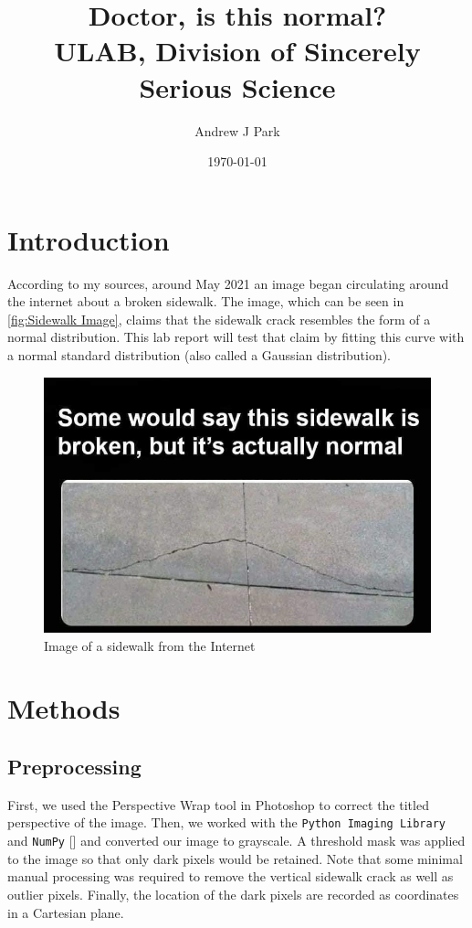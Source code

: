\documentclass{article}
\title{Doctor, is this normal? \\ \large ULAB, Division of Sincerely Serious Science}
\author{Andrew J Park}
\date{\today}
\begin{document}
\maketitle

\section{Introduction}

According to my sources, around May 2021 an image began circulating around the internet about a broken
sidewalk. The image, which can be seen in \autoref{fig:Sidewalk Image}, claims that the sidewalk crack resembles the form
of a normal distribution. This lab report will test that claim by fitting this curve with a normal standard
distribution (also called a Gaussian distribution).

\begin{figure}[h]
    \centering
    \includegraphics[width=0.8\linewidth]{img.jpg}
    \caption{Image of a sidewalk from the Internet}
    \label{fig:Sidewalk Image}
\end{figure}

\section{Methods}

\subsection{Preprocessing}

First, we used the Perspective Wrap tool in Photoshop to correct the titled perspective of the image. Then,
we worked with the \texttt{Python Imaging Library} and \texttt{NumPy} [\cite{2020NumPy-Array}] and converted our image to grayscale.
A threshold mask was applied to the image so that only dark pixels would be retained. Note that some
minimal manual processing was required to remove the vertical sidewalk crack as well as outlier pixels.
Finally, the location of the dark pixels are recorded as coordinates in a Cartesian plane.
\end{document}

